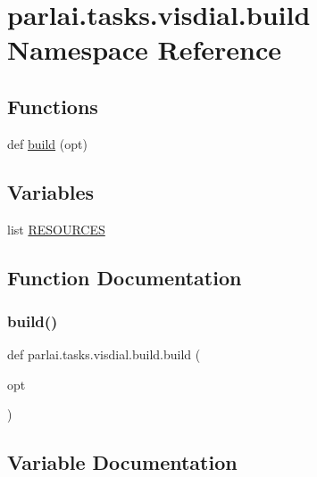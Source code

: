 \hypertarget{namespaceparlai_1_1tasks_1_1visdial_1_1build}{}\section{parlai.\+tasks.\+visdial.\+build Namespace Reference}
\label{namespaceparlai_1_1tasks_1_1visdial_1_1build}
\subsection*{Functions}
\begin{DoxyCompactItemize}
\item 
def \hyperlink{namespaceparlai_1_1tasks_1_1visdial_1_1build_a67068d01ede2596cbe1100e5f0896f3c}{build} (opt)
\end{DoxyCompactItemize}
\subsection*{Variables}
\begin{DoxyCompactItemize}
\item 
list \hyperlink{namespaceparlai_1_1tasks_1_1visdial_1_1build_aa57a6e9e4689a1e416227c832c952567}{R\+E\+S\+O\+U\+R\+C\+ES}
\end{DoxyCompactItemize}


\subsection{Function Documentation}
\mbox{\label{namespaceparlai_1_1tasks_1_1visdial_1_1build_a67068d01ede2596cbe1100e5f0896f3c}} 
\subsubsection{\texorpdfstring{build()}{build()}}
{\footnotesize\ttfamily def parlai.\+tasks.\+visdial.\+build.\+build (\begin{DoxyParamCaption}\item[{}]{opt }\end{DoxyParamCaption})}



\subsection{Variable Documentation}
\mbox{\label{namespaceparlai_1_1tasks_1_1visdial_1_1build_aa57a6e9e4689a1e416227c832c952567}} 
